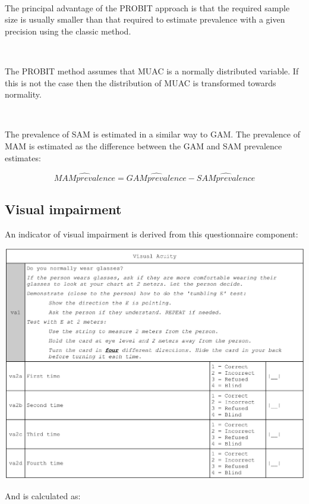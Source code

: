\documentclass[12pt,a4paper]{book}
\theoremstyle{definition}
\theoremstyle{definition}
\theoremstyle{definition}
\theoremstyle{remark}
\begin{document}
~

The principal advantage of the PROBIT approach is that the required
sample size is usually smaller than that required to estimate prevalence
with a given precision using the classic method.

~

The PROBIT method assumes that MUAC is a normally distributed variable.
If this is not the case then the distribution of MUAC is transformed
towards normality.

~

The prevalence of SAM is estimated in a similar way to GAM. The
prevalence of MAM is estimated as the difference between the GAM and SAM
prevalence estimates:

\[\widehat{MAM prevalence} = \widehat{GAM prevalence} - \widehat{SAM prevalence}\]

\newpage

\hypertarget{visual-impairment}{%
\subsection{Visual impairment}\label{visual-impairment}}

An indicator of visual impairment is derived from this questionnaire
component:

\begin{center}\includegraphics[width=23.81in]{figures/questionnaire12} \end{center}

\newpage

And is calculated as:
\end{document}
